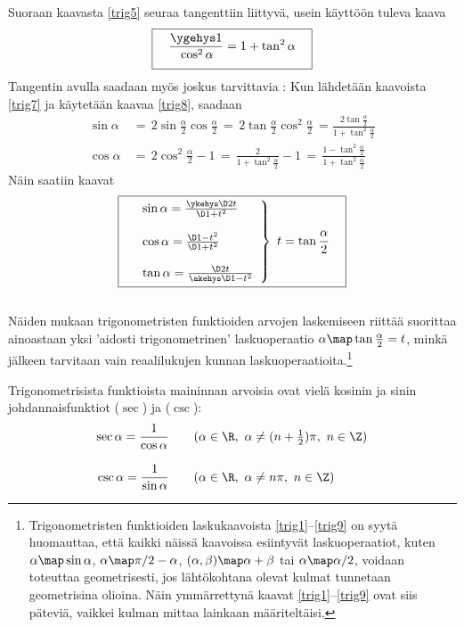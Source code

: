 Suoraan kaavasta \eqref{trig5} seuraa tangenttiin liittyvä, usein käyttöön tuleva kaava
\begin{equation} \label{trig8}
\boxed{\quad \frac{\ygehys 1}{\rule[-2mm]{0mm}{2mm} \cos^2 \alpha} = 1 + \tan^2 \alpha \quad }
\end{equation}
Tangentin avulla saadaan myös joskus tarvittavia : Kun lähdetään
kaavoista \eqref{trig7} ja käytetään kaavaa \eqref{trig8}, saadaan
\begin{align*}
\sin \alpha &\,=\,2 \sin \frac{\alpha}{2} \cos \frac{\alpha}{2}
             \,=\, 2 \tan \frac{\alpha}{2} \cos^2 \frac{\alpha}{2}
             \,= \frac{2\tan \frac{\alpha}{2}}{1 + \tan^2 \frac{\alpha}{2}} \\
\cos \alpha &\,=\,2\cos^2 \frac{\alpha}{2} - 1
             \,=\,\frac{2}{1+\tan^2 \frac{\alpha}{2}} - 1 
             \,=\,\frac{1 - \tan^2 \frac{\alpha}{2}}{1 + \tan^2 \frac{\alpha}{2}}
\end{align*}
Näin saatiin kaavat \\
\begin{equation} \label{trig9}
\boxed{\quad\left.\begin{array}{ll}
\sin\alpha = \frac{\ykehys \D 2t}{\D 1+t^2} \\ \\
\cos\alpha = \frac{\D 1-t^2}{\D 1+t^2} \\ \\
\tan\alpha = \frac{\D 2t}{\akehys \D 1-t^2}
\end{array}\right\} \ t= \tan \frac{\alpha}{2} \quad}
\end{equation} \\
Näiden mukaan trigonometristen funktioiden arvojen laskemiseen riittää suorittaa ainoastaan yksi
'aidosti trigonometrinen' laskuoperaatio $\alpha \map \tan \frac{\alpha}{2} = t$, minkä jälkeen
tarvitaan vain reaalilukujen kunnan laskuoperaatioita.\footnote[1]{Trigonometristen funktioiden
laskukaavoista \eqref{trig1}--\eqref{trig9} on syytä huomauttaa, että kaikki näissä kaavoissa
esiintyvät laskuoperaatiot, kuten $\alpha\map\sin\alpha$, $\alpha\map\pi/2-\alpha$,
$(\alpha,\beta)\map\alpha+\beta$ tai $\alpha\map\alpha/2$, voidaan toteuttaa geometrisesti, jos
lähtökohtana olevat kulmat tunnetaan geometrisina olioina. Näin ymmärrettynä kaavat 
\eqref{trig1}--\eqref{trig9} ovat siis päteviä, vaikkei kulman mittaa lainkaan määriteltäisi.}

Trigonometrisista funktioista maininnan arvoisia ovat vielä kosinin ja sinin johdannaisfunktiot
 ($\sec$) ja  ($\csc$):
\begin{align*}
\sec \alpha = \frac{1}{\cos \alpha} \qquad 
                     &(\alpha \in \R, \ \alpha \neq (n + \tfrac{1}{2}) \pi, \ n \in \Z) \\[3mm]
\csc \alpha = \frac{1}{\sin \alpha} \qquad 
                     &(\alpha \in \R, \ \alpha \neq n \pi, \ n \in \Z)
\end{align*}


